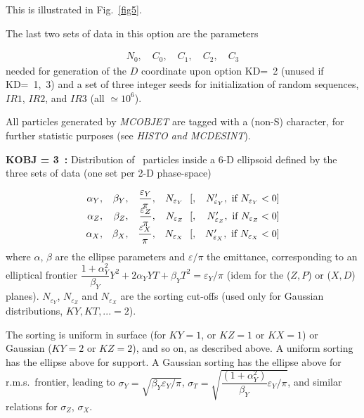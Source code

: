 \noindent This is illustrated in Fig.~\ref{fig5}.

\medskip

\noindent The last two sets of data in this option are the parameters 

 \begin{gather*}
	N_0,\quad C_0,\quad C_1,\quad C_2,\quad C_3 
 \end{gather*}
%
 needed for generation of the $ D $ coordinate upon option \mbox{KD=  2}  
(unused if \mbox{KD= 1, 3}) and a set of three integer seeds for initialization 
of random sequences, $ IR1$,   $ IR2$,   and $ IR3$ (all $\simeq 10^6 $).


\noindent All particles generated by \textsl{MCOBJET}  are tagged with
a (non-S) character, for further statistic purposes (see \textsl{HISTO \textrm{and}  
MCDESINT}).  

\medskip

\noindent\textbf{KOBJ  = 3~:} Distribution of \IMAX\ particles inside a
6-D ellipsoid defined by the three sets of data (one set per 
 2-D phase-space)

$$
\begin{array}{*{4}{r<{,}}r}
 \alpha_ Y  &   \beta_ Y  
            &  \dfrac{ \varepsilon_Y}{\pi} 
            &  N_{\varepsilon_ Y}  ~~[
            & N'_{\varepsilon_ Y}, \text{ if } N_{\varepsilon_ Y} < 0] \\
\alpha_ Z   &  \beta_ Z  
            &  \dfrac{ \varepsilon_Z }{ \pi} 
            & N_{\varepsilon_ Z} ~~[
            & N'_{\varepsilon_ Z}, \text{ if } N_{\varepsilon_ Z} < 0] \\
\alpha_ X   & \beta_ X 
            &  \dfrac{\varepsilon_X }{ \pi} 
            & N_{\varepsilon_ X} ~~[
            & N'_{\varepsilon_ X}, \text{ if } N_{\varepsilon_ X} < 0] 
\end{array}           
$$            
%
where $\alpha$, $\beta$ are the ellipse parameters and $\varepsilon/ 
\pi$ the emittance, corresponding to an elliptical  frontier 
$\dfrac{1 + \alpha^2_Y}{\beta_Y} Y^2 + 2 \alpha_Y YT + \beta_Y T^2 = 
\varepsilon_Y / \pi$ (idem for the ($Z, P$) 
or ($X, D$) planes). $N_{\varepsilon_ Y}$, $N_{\varepsilon_ Z}$ and 
$N_{\varepsilon_ X}$ are the sorting cut-offs (used only for Gaussian 
distributions, $KY, KT, ...=2$).

\noindent The sorting is uniform in surface (for $KY=1$, or $KZ=1$ 
or $KX=1$) or Gaussian ($KY=2$ or $KZ=2$), and so on, as described 
above. A uniform sorting has the ellipse above for support. A 
Gaussian sorting has the ellipse above for r.m.s.~frontier, leading 
to $\sigma_Y = \sqrt {\beta_Y \varepsilon_Y / \pi}$, 
$\sigma_T = \sqrt {\dfrac{(1+\alpha_Y^2)}{\beta_Y} \varepsilon_Y / \pi}$, 
and similar relations for $\sigma_Z$, $\sigma_X$.

